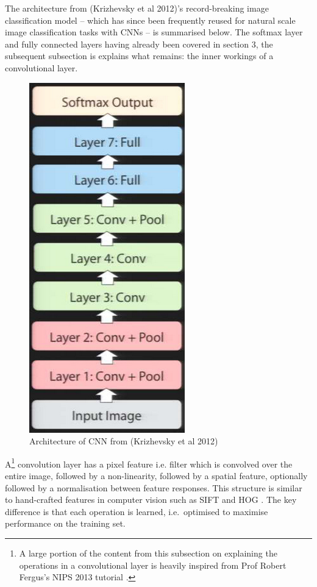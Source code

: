 \documentclass[a4paper,11pt]{article}
\begin{document}
The architecture from (Krizhevsky et al 2012)'s record-breaking image classification model -- which has since been frequently reused for natural scale image classification tasks with CNNs \cite{rectifier} \cite{goodfellow_street_view} \cite{decaf} \cite{fergus_tutorial} \cite{colah} \cite{zeiler_fergus} \cite{transfer-learning} \cite{caffe-website}  -- is summarised below. The softmax layer and fully connected layers having already been covered in section 3, the subsequent subsection is explains what remains: the inner workings of a convolutional layer. \\

\begin{figure}[h!]
	\centering
	\includegraphics[scale=0.3]{images/alexnet_architecture_simple.png}
	\caption{Architecture of CNN from (Krizhevsky et al 2012)}
\end{figure}

A\footnote{A large portion of the content from this subsection on explaining the operations in a convolutional layer is heavily inspired from Prof Robert Fergus's NIPS 2013 tutorial \cite{fergus_tutorial}.} convolution layer has a pixel feature i.e. filter which is convolved over the entire image, followed by a non-linearity, followed by a spatial feature, optionally followed by a normalisation between feature responses. This structure is similar to hand-crafted features in computer vision such as SIFT and HOG \cite{SIFT}. The key difference is that each operation is learned, i.e.\ optimised to maximise performance on the training set. \\
\end{document}
